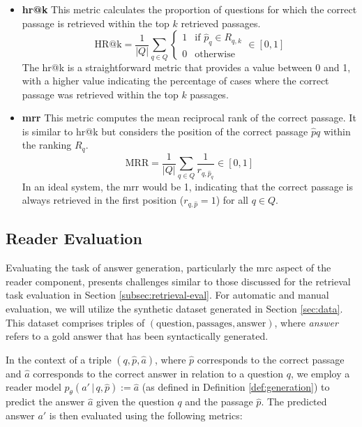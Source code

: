 \begin{itemize}
    \item \textbf{\gls{hr}@k} This metric calculates the proportion of questions for which the correct passage is retrieved within the top $k$ retrieved passages.
    \begin{equation}
        \text{HR@k} = \frac{1}{|Q|} \sum_{q \in Q} 
        \begin{cases}
            1 & \text{if } \hat{p}_q \in R_{q,k} \\
            0 & \text{otherwise}
        \end{cases}
        \in [0,1]
    \end{equation}
    The \gls{hr}@k is a straightforward metric that provides a value between 0 and 1, with a higher value indicating the percentage of cases where the correct passage was retrieved within the top $k$ passages.
    \item \textbf{\gls{mrr}} This metric computes the mean reciprocal rank of the correct passage. It is similar to \gls{hr}@k but considers the position of the correct passage $\hat{p}q$ within the ranking $R_q$.
    \begin{equation}
        \text{MRR} = \frac{1}{|Q|} \sum_{q \in Q} \frac{1}{r_{q,\hat{p}_q}} \in [0,1]
    \end{equation}
    In an ideal system, the \gls{mrr} would be 1, indicating that the correct passage is always retrieved in the first position ($r_{q,\hat{p}} = 1$) for all $q \in Q$.
\end{itemize}

\subsection{Reader Evaluation}
\label{subsec:answer-generation-eval}

Evaluating the task of answer generation, particularly the \gls{mrc} aspect of the reader component, presents challenges similar to those discussed for the retrieval task evaluation in Section \ref{subsec:retrieval-eval}. For automatic and manual evaluation, we will utilize the synthetic dataset generated in Section \ref{sec:data}. This dataset comprises triples of $(\text{question}, \text{passages}, \text{answer})$, where \textit{answer} refers to a gold answer that has been syntactically generated.

In the context of a triple $(q, \hat{p}, \hat{a})$, where $\hat{p}$ corresponds to the correct passage and $\hat{a}$ corresponds to the correct answer in relation to a question $q$, we employ a reader model $p_\theta(a' \, | \, q, \hat{p}) := \hat{a}$ (as defined in Definition \ref{def:generation}) to predict the answer $\hat{a}$ given the question $q$ and the passage $\hat{p}$. The predicted answer $a'$ is then evaluated using the following metrics:

